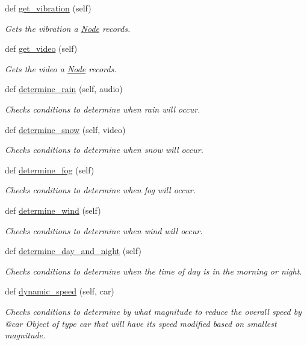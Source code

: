 \begin{DoxyCompactItemize}
def \mbox{\hyperlink{class_node_1_1_node_a1f9f5f5016e27b9233f29dd35fd91f95}{get\+\_\+vibration}} (self)
\begin{DoxyCompactList}\small\item\em Gets the vibration a \mbox{\hyperlink{class_node_1_1_node}{Node}} records. \end{DoxyCompactList}\item 
def \mbox{\hyperlink{class_node_1_1_node_ad7a4d2511f3a7c8462baeceb0cc44a98}{get\+\_\+video}} (self)
\begin{DoxyCompactList}\small\item\em Gets the video a \mbox{\hyperlink{class_node_1_1_node}{Node}} records. \end{DoxyCompactList}\item 
def \mbox{\hyperlink{class_node_1_1_node_ac66862267153afed7cdf5db16fb90eb0}{determine\+\_\+rain}} (self, audio)
\begin{DoxyCompactList}\small\item\em Checks conditions to determine when rain will occur. \end{DoxyCompactList}\item 
def \mbox{\hyperlink{class_node_1_1_node_af1e7e8c1f671e57b873b856a7a104da4}{determine\+\_\+snow}} (self, video)
\begin{DoxyCompactList}\small\item\em Checks conditions to determine when snow will occur. \end{DoxyCompactList}\item 
def \mbox{\hyperlink{class_node_1_1_node_a92a7071da302661b0a5df1cd90de7f69}{determine\+\_\+fog}} (self)
\begin{DoxyCompactList}\small\item\em Checks conditions to determine when fog will occur. \end{DoxyCompactList}\item 
def \mbox{\hyperlink{class_node_1_1_node_a07838912223c0dc314f0bba74a2abb5f}{determine\+\_\+wind}} (self)
\begin{DoxyCompactList}\small\item\em Checks conditions to determine when wind will occur. \end{DoxyCompactList}\item 
def \mbox{\hyperlink{class_node_1_1_node_a2e14dba01b0b78803924fad4b342a92f}{determine\+\_\+day\+\_\+and\+\_\+night}} (self)
\begin{DoxyCompactList}\small\item\em Checks conditions to determine when the time of day is in the morning or night. \end{DoxyCompactList}\item 
def \mbox{\hyperlink{class_node_1_1_node_a5e3ffc50f87858774b84e49a7b3b6324}{dynamic\+\_\+speed}} (self, car)
\begin{DoxyCompactList}\small\item\em Checks conditions to determine by what magnitude to reduce the overall speed by @car Object of type car that will have its speed modified based on smallest magnitude. \end{DoxyCompactList}\end{DoxyCompactItemize}
